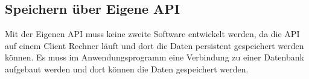 \subsection{Speichern über Eigene API}
\label{save_data_own_api_kon}

Mit der Eigenen API muss keine zweite Software entwickelt werden, da die API auf einem Client Rechner läuft und dort die Daten persistent gespeichert werden können. Es muss im Anwendungsprogramm eine Verbindung zu einer Datenbank aufgebaut werden und dort können die Daten gespeichert werden.